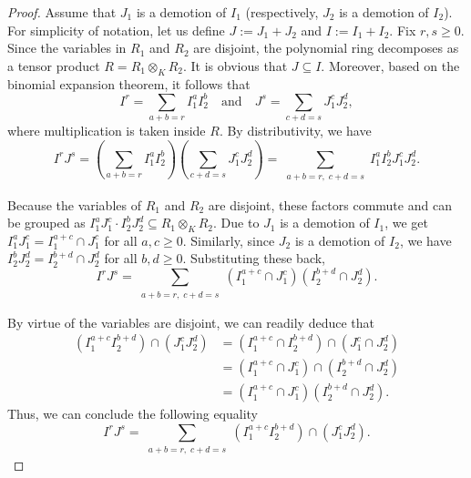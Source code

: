 \documentclass[10pt,a4paper]{amsart}
\begin{document}
\begin{proof}
Assume that   $J_1$ is  a demotion of $I_1$ (respectively,  $J_2$ is  a demotion of $I_2$). For simplicity of notation, let us define $J := J_1 + J_2$ 
and $I := I_1 + I_2$.  Fix $r,s\geq 0$.  Since the variables in \(R_1\) and \(R_2\) are disjoint, the polynomial
 ring decomposes as a tensor product $R = R_1 \otimes_K R_2.$ It is obvious that $J \subseteq I$. 
 Moreover, based on the binomial expansion theorem,  it follows that
\[
I^r = \sum_{a+b=r} I_1^a I_2^b \quad \text{and}  \quad J^s = \sum_{c+d=s} J_1^c J_2^d,
\]
where multiplication is taken inside \(R\).  By distributivity, we have 
\[
I^r J^s = \left( \sum_{a+b=r} I_1^a I_2^b \right) \left( \sum_{c+d=s} J_1^c J_2^d \right) = \sum_{\substack{a+b=r, \; c+d=s}} I_1^a I_2^b J_1^c J_2^d.
\]

Because the variables of \(R_1\) and \(R_2\) are disjoint, these factors commute and can be grouped as $I_1^a J_1^c \cdot I_2^b J_2^d \subseteq R_1 \otimes_K R_2.$
Due to  \(J_1\) is a demotion of \(I_1\), we get $I_1^a J_1^c = I_1^{a+c} \cap J_1^c$ for all \(a, c \geq 0\). Similarly, since \(J_2\) is a demotion of \(I_2\), we have
$I_2^b J_2^d = I_2^{b+d} \cap J_2^d$ for all \(b, d \geq 0\). Substituting these back,  
\[
I^r J^s = \sum_{\substack{a+b=r, \; c+d=s}} (I_1^{a+c} \cap J_1^c)(I_2^{b+d} \cap J_2^d).
\]

By virtue of  the variables are disjoint, we can readily deduce that 
 \begin{align*}
  (I_1^{a+c} I_2^{b+d}) \cap (J_1^c J_2^d) &=   (I_1^{a+c} \cap  I_2^{b+d}) \cap (J_1^c \cap  J_2^d)\\
 &= (I_1^{a+c} \cap J_1^c) \cap ( I_2^{b+d} \cap  J_2^d)\\
 &= (I_1^{a+c} \cap J_1^c) ( I_2^{b+d} \cap  J_2^d).
 \end{align*}
Thus, we can conclude the following equality 
\[
I^r J^s = \sum_{\substack{a+b=r,\; c+d=s}} (I_1^{a+c} I_2^{b+d}) \cap (J_1^c J_2^d).
\]


\end{proof}
\end{document}
